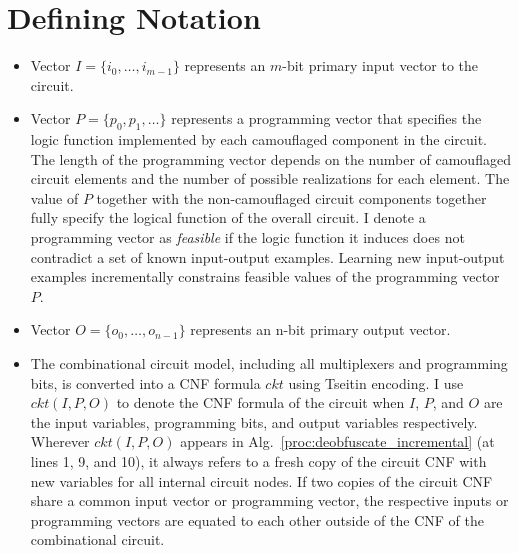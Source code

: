 \documentclass[thesis]{umassthesis}  %
\begin{document}

\section{Defining Notation}
\begin{itemize}

\item Vector $I=\{i_0,\dots, i_{m-1}\}$ represents an $m$-bit primary input vector to the circuit.%

\item Vector $P=\{  p_{0}, p_{1}, \dots \}$ represents a programming vector that specifies the logic function implemented by each camouflaged component in the circuit. The length of the programming vector depends on the number of camouflaged circuit elements and the number of possible realizations for each element. The value of $P$ together with the non-camouflaged circuit components together fully specify the logical function of the overall circuit. I denote a programming vector as \textit{feasible} if the logic function it induces does not contradict a set of known input-output examples. Learning new input-output examples incrementally constrains feasible values of the programming vector $P$.

\item Vector $O=\{o_0,\dots,o_{n-1}\}$ represents an n-bit primary output vector. %

\item The combinational circuit model, including all multiplexers and programming bits, is converted into a CNF formula $ckt$ using Tseitin encoding. I use $ckt(I,P,O)$ to denote the CNF formula of the circuit when $I$, $P$, and $O$ are the input variables, programming bits, and output variables respectively. Wherever $ckt(I,P,O)$ appears in Alg.~\ref{proc:deobfuscate_incremental} (at lines 1, 9, and 10), it always refers to a fresh copy of the circuit CNF with new variables for all internal circuit nodes. If two copies of the circuit CNF share a common input vector or programming vector, the respective inputs or programming vectors are equated to each other outside of the CNF of the combinational circuit. %


\end{itemize}
\end{document}
